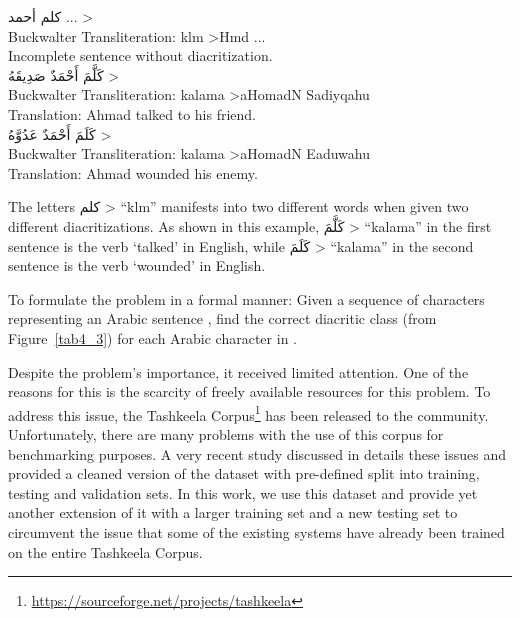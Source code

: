 \documentclass[11pt,a4paper]{article}
\newenvironment{myquote}{\list{}{\leftmargin=0.1in\rightmargin=0.1in}\item[]}{\endlist}
\begin{document}
\begin{myquote}
\centering
\<
كلم أحمد ...
> \\
Buckwalter Transliteration: klm {\textgreater}Hmd ... \\
Incomplete sentence without diacritization. \\
\<
كَلَّمَ أَحْمَدٌ صَدِيقَهُ
>\\
Buckwalter Transliteration: k{\color{red}a}l{\color{red}a}m{\color{red}a} {\textgreater}{\color{red}a}H{\color{red}o}m{\color{red}a}d{\color{red}N} S{\color{red}a}d{\color{red}i}yq{\color{red}a}h{\color{red}u} \\
Translation: Ahmad talked to his friend. \\
\<
كَلَمَ أَحْمَدٌ عَدُوَّهُ
> \\
Buckwalter Transliteration: k{\color{red}a}l{\color{red}a}m{\color{red}a} {\textgreater}{\color{red}a}H{\color{red}o}m{\color{red}a}d{\color{red}N} E{\color{red}a}d{\color{red}u}w{\color{red}a}h{\color{red}u} \\
Translation: Ahmad wounded his enemy.
\end{myquote}

The letters
\<
كلم 
>
``klm'' manifests into two different words when given two different diacritizations. As shown in this example,
\<
كَلَّمَ 
>
``kalama'' in the first sentence is the verb `talked' in English, while
\<
كَلَمَ
>
``kalama'' in the second sentence is the verb `wounded' in English.

To formulate the problem in a formal manner: Given a sequence of characters representing an Arabic sentence , find the correct diacritic class (from Figure~\ref{tab4_3}) for each Arabic character  in .

Despite the problem's importance, it received limited attention. One of the reasons for this is the scarcity of freely available resources for this problem. To address this issue, the Tashkeela Corpus\footnote{\url{https://sourceforge.net/projects/tashkeela}} \cite{zerrouki2017tashkeela} has been released to the community. Unfortunately, there are many problems with the use of this corpus for benchmarking purposes. A very recent study \cite{dataset} discussed in details these issues and provided a cleaned version of the dataset with pre-defined split into training, testing and validation sets. In this work, we use this dataset and provide yet another extension of it with a larger training set and a new testing set to circumvent the issue that some of the existing systems have already been trained on the entire Tashkeela Corpus.
\end{document}
